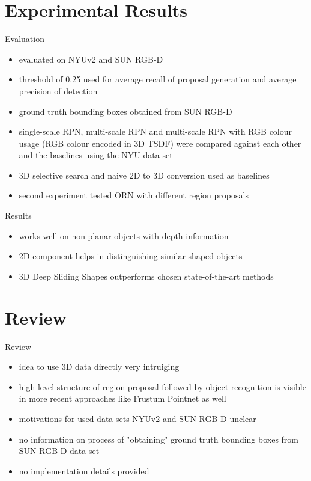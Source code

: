 \documentclass{beamer}
\begin{document}
\section{Experimental Results}
\begin{frame}{Evaluation}
    \begin{itemize}
        \item evaluated on NYUv2\cite{Silberman2012} and SUN RGB-D\cite{Song2015}
        \vfill
        \item threshold of 0.25 used for average recall of proposal generation and
              average precision of detection
        \vfill
        \item ground truth bounding boxes obtained from SUN RGB-D
        \vfill
        \item single-scale RPN, multi-scale RPN and multi-scale RPN with RGB colour
              usage (RGB colour encoded in 3D TSDF) were compared against each
              other and the baselines using the NYU data set
        \vfill
        \item 3D selective search and naive 2D to 3D conversion used as baselines
        \vfill
        \item second experiment tested ORN with different region proposals
    \end{itemize}
\end{frame}

\begin{frame}{Results}
    \begin{itemize}
        \item works well on non-planar objects with depth information
        \vfill
        \item 2D component helps in distinguishing similar shaped objects
        \vfill
        \item 3D Deep Sliding Shapes outperforms chosen state-of-the-art methods
    \end{itemize}
\end{frame}

\section{Review}
\begin{frame}{Review}
    \begin{itemize}
        \item idea to use 3D data directly very intruiging
        \vfill
        \item high-level structure of region proposal followed by object recognition
              is visible in more recent approaches like Frustum Pointnet\cite{Qi2017}
              as well
        \vfill
        \item motivations for used data sets NYUv2 and SUN RGB-D unclear
        \vfill
        \item no information on process of "obtaining" ground truth bounding boxes
              from SUN RGB-D data set
        \vfill
        \item no implementation details provided
    \end{itemize}
\end{frame}
\end{document}
